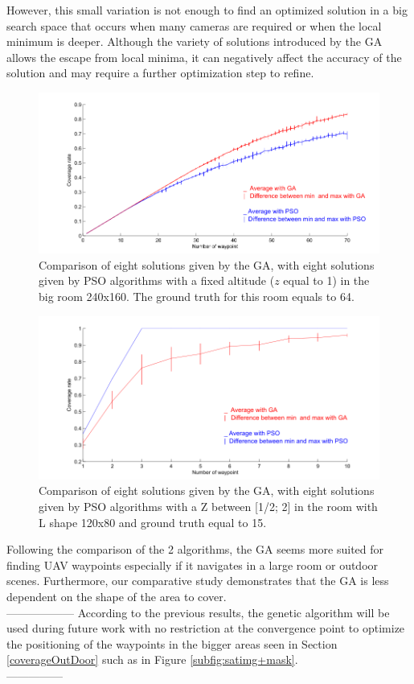 However, this small variation is not enough to find an optimized solution in a big search space that occurs when many cameras are required or when the local minimum is deeper.
Although the variety of solutions introduced by the GA allows the escape from local minima, it can negatively affect the accuracy of the solution and may require a further optimization step to refine. 

\begin{figure}
  \includegraphics[width=\linewidth]{img/fig8.png}
  \caption{ Comparison of eight solutions given by the GA, with eight solutions given by PSO algorithms with a fixed altitude ($z$ equal to 1) in the big room 240x160. The ground truth for this room equals to 64.}\label{fig:bigRz1}
   \endminipage\hfill
\end{figure}
%
%
\begin{figure}
  \includegraphics[width=\linewidth]{img/fig9.png}
  \caption{Comparison of eight solutions given by the GA, with eight solutions given by PSO algorithms with a Z between [1/2; 2] in the room with L shape 120x80 and ground truth equal to 15.}\label{fig:RLz2}
   \endminipage\hfill
\end{figure}

 Following the comparison of the 2 algorithms, the GA seems more suited for finding UAV waypoints especially if it navigates in a large room or  outdoor scenes.
Furthermore, our comparative study demonstrates that the GA is less dependent on the shape of the area to cover. \\
------------------
According to the previous results, the genetic algorithm will be used during future work with no restriction at the convergence point to optimize the positioning of the waypoints in the bigger areas seen in Section  \ref{coverageOutDoor} such as in Figure \ref{subfig:satimg+mask}.\\
---------------


